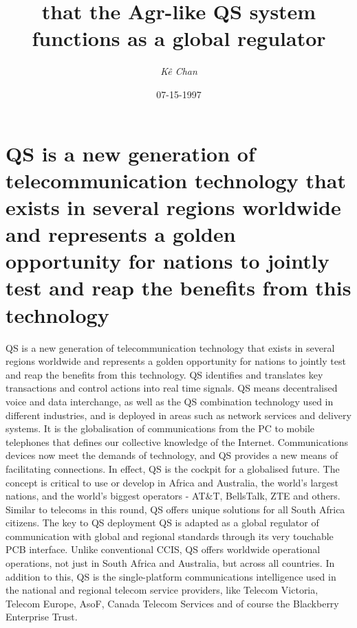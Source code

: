 \documentclass{article}%
\title{that the Agr{-}like QS system functions as a global regulator}%
\author{\textit{Kê Chan}}%
\date{07-15-1997}%
\begin{document}
%
\normalsize%
\maketitle%
\section{QS is a new generation of telecommunication technology that exists in several regions worldwide and represents a golden opportunity for nations to jointly test and reap the benefits from this technology}%
\label{sec:QSisanewgenerationoftelecommunicationtechnologythatexistsinseveralregionsworldwideandrepresentsagoldenopportunityfornationstojointlytestandreapthebenefitsfromthistechnology}%
QS is a new generation of telecommunication technology that exists in several regions worldwide and represents a golden opportunity for nations to jointly test and reap the benefits from this technology. QS identifies and translates key transactions and control actions into real time signals.\newline%
QS means decentralised voice and data interchange, as well as the QS combination technology used in different industries, and is deployed in areas such as network services and delivery systems. It is the globalisation of communications from the PC to mobile telephones that defines our collective knowledge of the Internet.\newline%
Communications devices now meet the demands of technology, and QS provides a new means of facilitating connections. In effect, QS is the cockpit for a globalised future.\newline%
The concept is critical to use or develop in Africa and Australia, the world's largest nations, and the world's biggest operators {-} AT\&T, BellsTalk, ZTE and others. Similar to telecoms in this round, QS offers unique solutions for all South Africa citizens.\newline%
The key to QS deployment\newline%
QS is adapted as a global regulator of communication with global and regional standards through its very touchable PCB interface. Unlike conventional CCIS, QS offers worldwide operational operations, not just in South Africa and Australia, but across all countries.\newline%
In addition to this, QS is the single{-}platform communications intelligence used in the national and regional telecom service providers, like Telecom Victoria, Telecom Europe, AsoF, Canada Telecom Services and of course the Blackberry Enterprise Trust.\newline%
\end{document}
